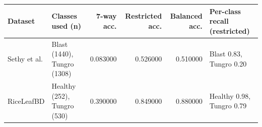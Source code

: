 \begin{tabular}{llrrrl}
\toprule
Dataset & Classes used (n) & 7-way acc. & Restricted acc. & Balanced acc. & Per-class recall (restricted) \\
\midrule
Sethy et al. & Blast (1440), Tungro (1308) & 0.083000 & 0.526000 & 0.510000 & Blast 0.83, Tungro 0.20 \\
RiceLeafBD & Healthy (252), Tungro (530) & 0.390000 & 0.849000 & 0.880000 & Healthy 0.98, Tungro 0.79 \\
\bottomrule
\end{tabular}
